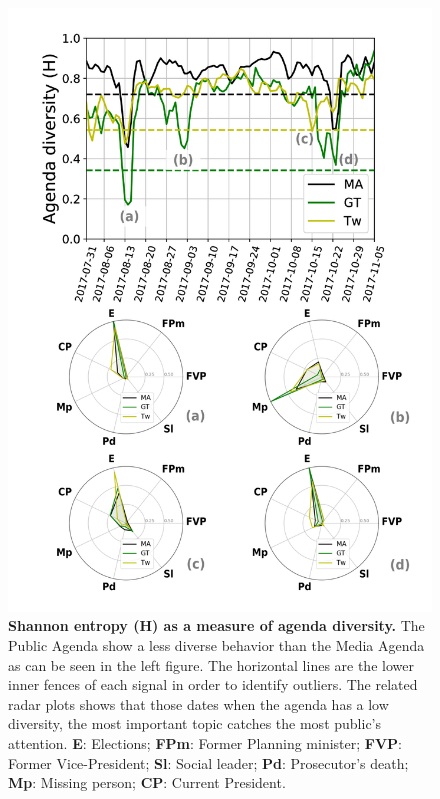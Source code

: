 \documentclass[a4paper, 12pt]{article}
\begin{document}
\begin{figure}[h]
\centering
\includegraphics[height=0.75\textheight]{images/Fig3.pdf}
\caption{\textbf{Shannon entropy (H) as a measure of agenda diversity.} The Public Agenda show a less diverse behavior than the Media Agenda as can be seen in the left figure. The horizontal lines are the lower inner fences of each signal in order to identify outliers. The related radar plots shows that those dates when the agenda has a low diversity, the most important topic catches the most public’s attention. \textbf{E}: Elections; \textbf{FPm}: Former Planning minister; \textbf{FVP}: Former Vice-President; \textbf{Sl}: Social leader; \textbf{Pd}: Prosecutor's death; \textbf{Mp}: Missing person; \textbf{CP}: Current President.}
\label{fig:shannon_entropy_agendas}
\end{figure}
\end{document}
